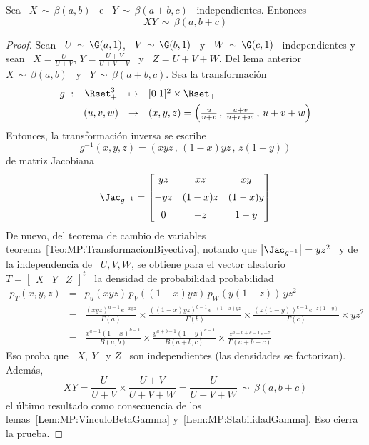 \begin{lema}
\label{Lem:StabilidadBeta}
%
  Sea  \  $X \,  \sim  \, \beta(a,b)$  \  e  \ $Y  \,  \sim  \, \beta(a+b,c)$  \
  independientes. Entonces
  \[
  X Y \, \sim \, \beta(a,b+c)
  \]
\end{lema}
%
\begin{proof}
  Sean \ $U  \, \sim \, \G(a,1)$, \ $V \,  \sim \, \G(b,1)$ \ y \  $W \, \sim \,
  \G(c,1)$   \   independientes  y   sean   \   $X   =  \frac{U}{U+V}$,   $Y   =
  \frac{U+V}{U+V+V}$  \ y  \ $Z  = U+V+W$.  Del lema  anterior \  $X \,  \sim \,
  \beta(a,b)$ \ y \ $Y \, \sim \, \beta(a+b,c)$. Sea la transformaci\'on
  \[
  \begin{array}{lccl}
    g\ : & \Rset_+^3 & \mapsto & [0 \; 1]^2 \times \Rset_+\\[1.5mm]
    & (u,v,w) & \to & (x,y,z) = \left( \frac{u}{u+v} \, , \, \frac{u+v}{u+v+w} \, , \, u+v+w \right)
  \end{array}
  \]
  Entonces, la transformaci\'on inversa se escribe
  \[
  g^{-1}(x,y,z) = \left( x y z \, , \, (1-x) y z \, , \, z (1-y) \right)
  \]
  de matriz Jacobiana
  \[
  \Jac_{g^{-1}} = \begin{bmatrix}
    y z  &   x z   &   x y   \\[2mm]
  - y z  & (1-x) z & (1-x) y \\[2mm]
    0    &  - z    &  1-y
  \end{bmatrix}
  \]
  De      nuevo,      del      teorema      de     cambio      de      variables
  teorema~\ref{Teo:MP:TransformacionBiyectiva}, notando que $\left| \Jac_{g^{-1}}
  \right| = y  z^2$ \ y de la independencia  de \ $U, V, W$,  se obtiene para el
  vector aleatorio  \ $  T =  \begin{bmatrix} X &  Y &  Z \end{bmatrix}^t$  \ la
  densidad de probabilidad probabilidad
  \begin{eqnarray*}
    p_T(x,y,z) & = & p_u( x y z ) \, p_V( (1-x) y z ) \, p_W( y (1-z) ) \, y z^2\\[2mm]
    & = & \frac{\left( x y z \right)^{a-1} \, e^{- x y z}}{\Gamma(a)} \times
    \frac{\left( (1-x) y z \right)^{b-1} \, e^{- (1-x) y z}}{\Gamma(b)} \times
    \frac{\left( z (1-y) \right)^{c-1} \, e^{- z (1-y)}}{\Gamma(c)} \times y
    z^2\\[2mm]
    & = & \frac{x^{a-1} (1-x)^{b-1}}{B(a,b)} \times \frac{y^{a+b-1}
      (1-y)^{c-1}}{B(a+b,c)} \times \frac{z^{a+b+c-1} e^{-z}}{\Gamma(a+b+c)}
  \end{eqnarray*}
  Eso proba  que \  $X, \ Y$  \ y  $Z$ \ son  independientes (las  densidades se
  factorizan). Adem\'as,
  \[
  X  Y =  \frac{U}{U+V} \times  \frac{U+V}{U+V+W} =  \frac{U}{U+V+W} \,  \sim \,
  \beta(a,b+c)
  \]
  el      \'ultimo       resultado      como      consecuencia       de      los
  lemas~\ref{Lem:MP:VinculoBetaGamma}    y~\ref{Lem:MP:StabilidadGamma}.     Eso
  cierra la prueba.
\end{proof}


